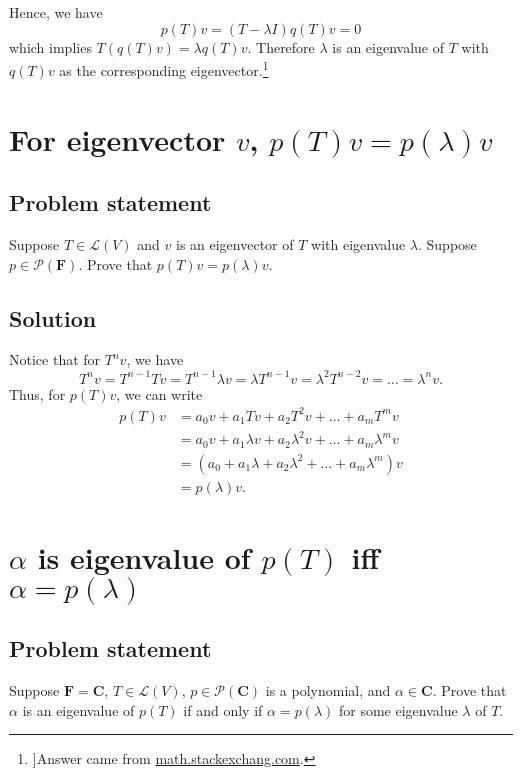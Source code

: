 \documentclass{article}
\begin{document}
Hence, we have
\[p(T)v=(T-\lambda I)q(T)v=0\]
which implies $T(q(T)v)=\lambda q(T)v$. 
Therefore $\lambda$ is an eigenvalue of $T$ with $q(T)v$ as the corresponding eigenvector.\footnote{
]Answer came from \href{https://math.stackexchange.com/questions/4695496/linear-algebra-done-right-exercise-5-b-9-solution-verification}{math.stackexchang.com}.
}

\clearpage

\section{For eigenvector $v$, $p(T)v=p(\lambda)v$}
\subsection*{Problem statement}
Suppose $T\in\mathcal{L}(V)$ and $v$ is an eigenvector of $T$ with eigenvalue $\lambda$. 
Suppose $p\in\mathcal{P}(\mathbf{F})$. 
Prove that $p(T)v=p(\lambda)v$.

\subsection*{Solution}
Notice that for \( T^n v \), we have
\[T^n v = T^{n-1} Tv = T^{n-1} \lambda v = \lambda T^{n-1} v = \lambda^2 T^{n-2} v = \dots = \lambda^n v.\]
Thus, for \( p(T) v \), we can write
\begin{align*}
    p(T) v &= a_0 v + a_1 T v + a_2 T^2 v + \dots + a_m T^m v\\
    &=a_0 v + a_1 \lambda v + a_2 \lambda^2 v + \dots + a_m \lambda^m v\\
    &=(a_0 + a_1 \lambda + a_2 \lambda^2 + \dots + a_m \lambda^m) v\\
    &=p(\lambda)v.
\end{align*}

\clearpage

\section{$\alpha$ is eigenvalue of $p(T)$ iff $\alpha=p(\lambda)$}
\subsection*{Problem statement}  
Suppose $\mathbf{F}=\mathbf{C}$, $T\in \mathcal{L}(V)$, $p\in\mathcal{P}(\mathbf{C})$ is a polynomial, and $\alpha \in \mathbf{C}$. 
Prove that $\alpha$ is an eigenvalue of $p(T)$ if and only if $\alpha=p(\lambda)$ for some eigenvalue $\lambda$ of $T$.
\end{document}
